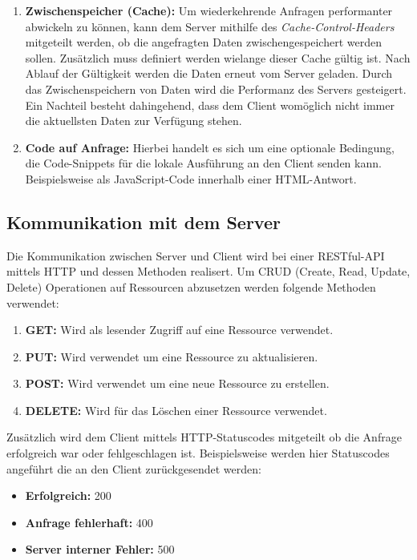 \documentclass[bachelor, german ]{hgbthesis}
\begin{document}
\begin{enumerate}
    \item \textbf{Zwischenspeicher (Cache): }
    Um wiederkehrende Anfragen performanter abwickeln zu können, kann dem Server mithilfe des \textit{Cache-Control-Headers} mitgeteilt werden, ob die angefragten Daten zwischengespeichert werden sollen.
    Zusätzlich muss definiert werden wielange dieser Cache gültig ist. Nach Ablauf der Gültigkeit werden die Daten erneut vom Server geladen.
    Durch das Zwischenspeichern von Daten wird die Performanz des Servers gesteigert. Ein Nachteil besteht dahingehend, dass dem Client womöglich nicht immer die aktuellsten Daten zur Verfügung stehen.
    \item \textbf{Code auf Anfrage: }
    Hierbei handelt es sich um eine optionale Bedingung, die Code-Snippets für die lokale Ausführung an den Client senden kann. Beispielsweise als JavaScript-Code innerhalb einer HTML-Antwort.
\end{enumerate}

\subsection{Kommunikation mit dem Server}
Die Kommunikation zwischen Server und Client wird bei einer RESTful-API mittels HTTP und dessen Methoden realisert.
Um CRUD (Create, Read, Update, Delete) Operationen auf Ressourcen abzusetzen werden folgende Methoden verwendet:
\begin{enumerate}
    \item \textbf{GET: }Wird als lesender Zugriff auf eine Ressource verwendet.
    \item \textbf{PUT: }Wird verwendet um eine Ressource zu aktualisieren.
    \item \textbf{POST: }Wird verwendet um eine neue Ressource zu erstellen.
    \item \textbf{DELETE: }Wird für das Löschen einer Ressource verwendet.
\end{enumerate}

Zusätzlich wird dem Client mittels HTTP-Statuscodes mitgeteilt ob die Anfrage erfolgreich war oder fehlgeschlagen ist. Beispielsweise werden hier Statuscodes angeführt die an den Client zurückgesendet werden:
\begin{itemize}
    \item \textbf{Erfolgreich:} 200
    \item \textbf{Anfrage fehlerhaft:} 400
    \item \textbf{Server interner Fehler:} 500
\end{itemize}
\end{document}
